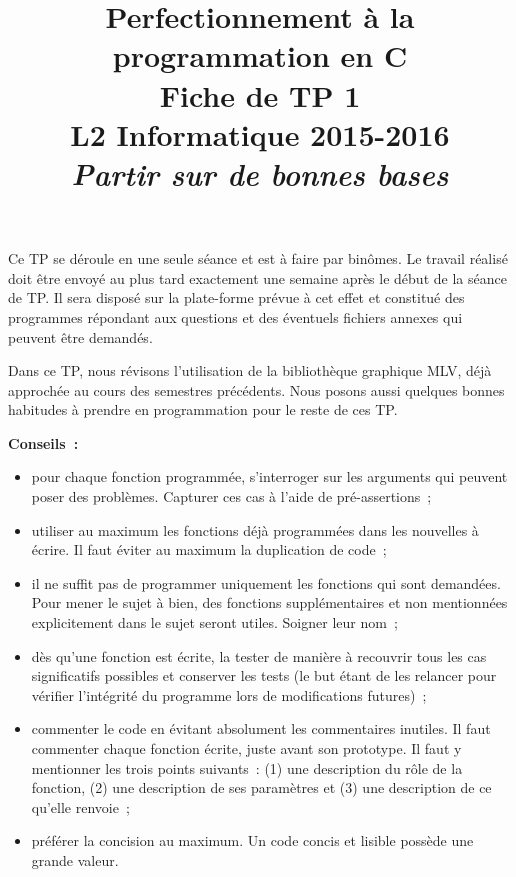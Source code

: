 \documentclass[12pt]{article}
\date{}
\title{{\bf Perfectionnement à la programmation en {\sf C}} \\
    Fiche de TP 1 \\
    {\small L2 Informatique 2015-2016} \\
    {\it \small Partir sur de bonnes bases}}
\theoremstyle{definition}
\begin{document}
\maketitle

Ce TP se déroule en une seule séance et est à faire par binômes.
Le travail réalisé doit être envoyé au plus tard exactement une
semaine après le début de la séance de TP. Il sera disposé sur
la plate-forme prévue à cet effet et constitué des programmes
répondant aux questions et des éventuels fichiers annexes qui
peuvent être demandés.
\bigskip
\bigskip

Dans ce TP, nous révisons l'utilisation de la bibliothèque graphique
{\sf MLV}, déjà approchée au cours des semestres précédents. Nous posons 
aussi quelques bonnes habitudes à prendre en programmation pour le reste 
de ces TP.
\bigskip
\bigskip

{\bf Conseils~:}
\begin{itemize}
    \item pour chaque fonction programmée, s'interroger sur les arguments
    qui peuvent poser des problèmes. Capturer ces cas à l'aide de
    pré-assertions~;
    \item utiliser au maximum les fonctions déjà programmées dans les
    nouvelles à écrire. Il faut éviter au maximum la duplication de code~;
    \item il ne suffit pas de programmer uniquement les fonctions qui sont
    demandées. Pour mener le sujet à bien, des fonctions supplémentaires
    et non mentionnées explicitement dans le sujet seront utiles. Soigner
    leur nom~;
    \item dès qu'une fonction est écrite, la tester de manière à
    recouvrir tous les cas significatifs possibles et conserver les tests
    (le but étant de les relancer pour vérifier l'intégrité du
    programme lors de modifications futures)~;
    \item commenter le code en évitant absolument les commentaires inutiles.
    Il faut commenter chaque fonction écrite, juste avant son prototype.
    Il faut y mentionner les trois points suivants~: (1) une description
    du rôle de la fonction, (2) une description de ses paramètres et (3)
    une description de ce qu'elle renvoie~;
    \item préférer la concision au maximum. Un code concis et lisible
    possède une grande valeur.
\end{itemize}
\bigskip
\bigskip
\end{document}
